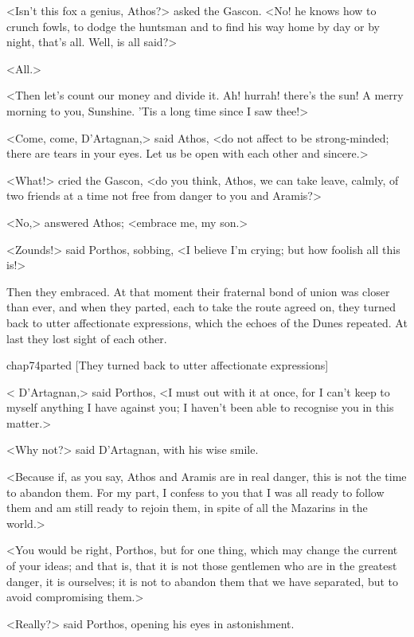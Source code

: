 <Isn't this fox a genius, Athos?> asked the Gascon. <No! he knows how to crunch fowls, to dodge the huntsman and to find his way home by day or by night, that's all. Well, is all said?>

<All.>

<Then let's count our money and divide it. Ah! hurrah! there's the sun! A merry morning to you, Sunshine. 'Tis a long time since I saw thee!>

<Come, come, D'Artagnan,> said Athos, <do not affect to be strong-minded; there are tears in your eyes. Let us be open with each other and sincere.>

<What!> cried the Gascon, <do you think, Athos, we can take leave, calmly, of two friends at a time not free from danger to you and Aramis?>

<No,> answered Athos; <embrace me, my son.>

<Zounds!> said Porthos, sobbing, <I believe I'm crying; but how foolish all this is!>

Then they embraced. At that moment their fraternal bond of union was closer than ever, and when they parted, each to take the route agreed on, they turned back to utter affectionate expressions, which the echoes of the Dunes repeated. At last they lost sight of each other.

\begin{bwbigpic}
	[\basicscale] 
	{chap74parted}
	[They turned back to utter affectionate expressions]
\end{bwbigpic}

< D'Artagnan,> said Porthos, <I must out with it at once, for I can't keep to myself anything I have against you; I haven't been able to recognise you in this matter.>

<Why not?> said D'Artagnan, with his wise smile.

<Because if, as you say, Athos and Aramis are in real danger, this is not the time to abandon them. For my part, I confess to you that I was all ready to follow them and am still ready to rejoin them, in spite of all the Mazarins in the world.>

<You would be right, Porthos, but for one thing, which may change the current of your ideas; and that is, that it is not those gentlemen who are in the greatest danger, it is ourselves; it is not to abandon them that we have separated, but to avoid compromising them.>

<Really?> said Porthos, opening his eyes in astonishment.

